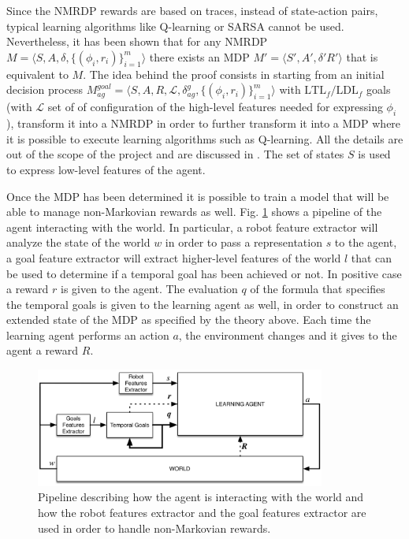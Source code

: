 Since the NMRDP rewards are based on traces, instead of state-action pairs,
typical learning algorithms like Q-learning or SARSA cannot be used.
Nevertheless, it has been shown \cite{DBLP:journals/corr/abs-1807-06333} that
for any NMRDP $M = \langle S, A, \delta, \{ (\phi_i, r_i) \}_{i=1}^m \rangle$
there exists an MDP $M' = \langle S', A', \delta' R' \rangle$ that is equivalent
to $M$. The idea behind the proof consists in starting from an initial
decision process $M_{ag}^{goal} = \langle S, A, R, \mathcal{L},
\delta_{ag}^g, \{ (\phi_i, r_i) \}_{i=1}^m \rangle$ with
$\text{LTL}_f/\text{LDL}_f$ goals (with $\mathcal{L}$ set of of configuration
of the high-level features needed for expressing $\phi_i$),
transform it into a NMRDP in order to
further transform it into a MDP where it is possible to execute learning
algorithms such as Q-learning. All the details are out of the scope of the
project and are discussed in \cite{DBLP:journals/corr/abs-1807-06333}. The
set of states $S$ is used to express low-level features of the agent.

Once the MDP has been determined it is possible to train a model that will
be able to manage non-Markovian rewards as well. Fig.
\ref{fig:rl-temporalgoals-pipeline} shows a pipeline of the
agent interacting with the world. In particular, a robot feature extractor
will analyze the state of the world $w$ in order to pass a representation $s$ to the
agent, a goal feature extractor will extract higher-level features of the world
$l$
that can be used to determine if a temporal goal has been achieved or not. In
positive case a reward $r$ is given to the agent. The evaluation $q$ of the formula
that specifies the temporal goals is given to the learning agent as well, in
order to construct an extended state of the MDP as specified by the theory above.
Each time the learning agent performs an action $a$, the environment changes
and it gives to the agent a reward $R$.
\begin{figure}
    \centering
    \includegraphics[width=0.85\textwidth]{images/rl-temporalgoals-pipeline.png}
    \caption{Pipeline describing how the agent is interacting with the
        world and how the robot features extractor and the goal features
        extractor are used in order to handle non-Markovian rewards.}
    \label{fig:rl-temporalgoals-pipeline}
\end{figure}

